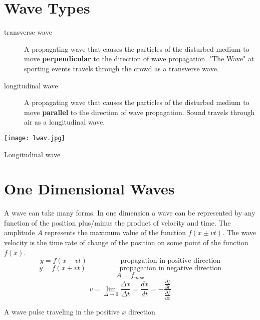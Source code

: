 \section{Wave Types}

\begin{description}
  \item[transverse wave] A propagating wave that causes the particles of the disturbed medium to move \textbf{perpendicular} to the direction of wave propagation.  "The Wave" at sporting events travels through the crowd as a transverse wave.  
  \item[longitudinal wave] A propagating wave that causes the particles of the disturbed medium to move \textbf{parallel} to the direction of wave propagation.  Sound travels through air as a longitudinal wave.
  
\end{description}

\begin{marginfigure}[0pt]
  \texttt{[image: lwav.jpg]}
  \caption{Longitudinal wave}
  \label{fig:marginfig}
\end{marginfigure}

\section {One Dimensional Waves}
A wave can take many forms.  In one dimension a wave can be represented by any function of the position plus/minus the product of velocity and time.  The amplitude $A$ represents the maximum value of the function $f(x \pm vt)$.  The wave velocity is the time rate of change of the position on some point of the function $f(x)$.
$$y=f(x-vt) \hspace{2cm} \text{propagation in positive direction}$$
$$y=f(x+vt) \hspace{2cm} \text{propagation in negative direction}$$
$$A=f_{max}$$
$$v=\lim _{\Delta \rightarrow 0}\frac{\Delta x}{\Delta t}=\frac{dx}{dt}=-\frac{\frac{\partial f}{\partial t}}{\frac{\partial f}{\partial x}}$$

\begin{marginfigure}[-130pt]%
  \caption{A wave pulse traveling in the positive $x$ direction}
  \label{fig:marginfig}
\end{marginfigure}
 
